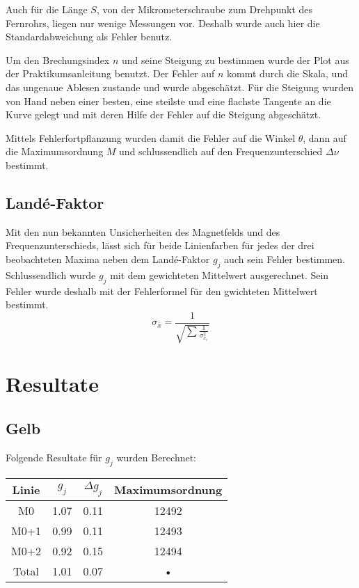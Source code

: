 \documentclass[a4paper,parskip,11pt, DIV12]{scrreprt}
\begin{document}
	Auch für die Länge $S$, von der Mikrometerschraube zum Drehpunkt des Fernrohrs, liegen nur wenige Messungen vor. Deshalb wurde auch hier die Standardabweichung als Fehler benutz.
	
	Um den Brechungsindex $n$ und seine Steigung zu bestimmen wurde der Plot aus der Praktikumsanleitung benutzt. Der Fehler auf $n$ kommt durch die Skala, und das ungenaue Ablesen zustande und wurde abgeschätzt.
Für die Steigung wurden von Hand neben einer besten, eine steilste und eine flachste Tangente an die Kurve gelegt und mit deren Hilfe der Fehler auf die Steigung abgeschätzt.

	Mittels Fehlerfortpflanzung wurden damit die Fehler auf die Winkel $\theta$, dann auf die Maximumsordnung $M$ und schlussendlich auf den Frequenzunterschied $\Delta \nu$ bestimmt.
	
	\section{Landé-Faktor}
	
	Mit den nun bekannten Unsicherheiten des Magnetfelds und des Frequenzunterschieds, lässt sich für beide Linienfarben für jedes der drei beobachteten Maxima neben dem Landé-Faktor $g_j$ auch sein Fehler bestimmen. Schlussendlich wurde $g_j$ mit dem gewichteten Mittelwert ausgerechnet. Sein Fehler wurde deshalb mit der Fehlerformel für den gwichteten Mittelwert bestimmt. 
	\begin{equation}
	\label{Fehler gewichteter Mittelwert}
	\sigma_{\bar{x}} = \frac{1}{\sqrt{\sum \frac{1}{\sigma_{x_i}^2}}}
	\end{equation}
	
	\chapter{Resultate}
	
	\section{Gelb}
	Folgende Resultate für $g_j$ wurden Berechnet:
	
\begin{tabular}{|c|c|c|c|}
\hline 
Linie  & $g_j$ & $\Delta g_j$ & Maximumsordnung \\ 
\hline 
M0 & 1.07 & 0.11 & 12492 \\ 
\hline 
M0+1 & 0.99 & 0.11 & 12493 \\ 
\hline 
M0+2 & 0.92 & 0.15 & 12494 \\ 
\hline 
Total & 1.01 & 0.07 & • \\ 
\hline 
\end{tabular} 
\end{document}
